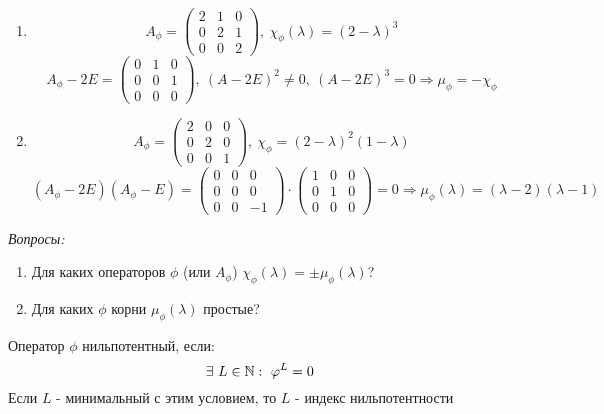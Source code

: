     \begin{example}\tab
        \begin{enumerate}
            \item $$A_\phi = \begin{pmatrix}
                2 & 1 & 0 \\
                0 & 2 & 1 \\
                0 & 0 & 2 
            \end{pmatrix}, \ \chi_\phi(\lambda) = (2-\lambda)^3 $$
            $$A_\phi - 2E = \begin{pmatrix}
                0 & 1 & 0 \\
                0 & 0 & 1 \\
                0 & 0 & 0 
            \end{pmatrix}, \ (A - 2E)^2 \neq 0, \ (A - 2E)^3 = 0 \Longrightarrow \mu_\phi = - \chi_\phi$$
            \item $$A_\phi = \begin{pmatrix}
                2 & 0 & 0 \\
                0 & 2 & 0 \\
                0 & 0 & 1 
            \end{pmatrix}, \ \chi_\phi = (2-\lambda)^2 (1-\lambda)$$
            $$(A_\phi - 2E)(A_\phi - E) = \begin{pmatrix}
                0 & 0 & 0 \\
                0 & 0 & 0 \\
                0 & 0 & -1 
            \end{pmatrix} \cdot \begin{pmatrix}
                1 & 0 & 0 \\
                0 & 1 & 0 \\
                0 & 0 & 0 
            \end{pmatrix} = 0 \Longrightarrow \mu_\phi(\lambda) = (\lambda-2)(\lambda-1)$$   
        \end{enumerate}
    \end{example}
    \textit{Вопросы:}
    \begin{enumerate}
        \item Для каких операторов $\phi$ (или $A_\phi$) $\chi_\phi(\lambda) = \pm \mu_\phi(\lambda)$?
        \item Для каких $\phi$ корни $\mu_\phi(\lambda)$ простые?   
    \end{enumerate}
    \begin{definition}
        Оператор $\phi$ нильпотентный, если:
        $$\exists \ L \in \N: \ \phi^L = 0$$
        Если $L$ - минимальный с этим условием, то $L$ - индекс нильпотентности    
    \end{definition}
